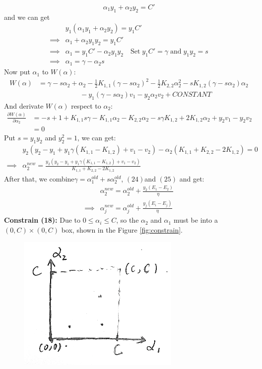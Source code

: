 \documentclass[a4paper]{article}
\begin{document}
\begin{enumerate}
{$$
	\alpha_1 y_1 + \alpha_2 y_2 = C'
$$
and we can get
\begin{align*}
	& y_1 (\alpha_1 y_1 + \alpha_2 y_2) = y_1 C' \\
	\implies & \alpha_1 + \alpha_2 y_1 y_2 = y_1 C' \\
	\implies & \alpha_1 = y_1 C' - \alpha_2 y_1 y_2 \quad \text{Set} \;  y_1 C' = \gamma \; \text{and} \;  y_1 y_2 = s \\
	\implies & \alpha_1 = \gamma - \alpha_2 s
\end{align*}
Now put $\alpha_1$ to $W(\alpha)$:
\begin{align*}
W(\alpha) &= \gamma - s \alpha_2 + \alpha_2 -\frac{1}{2}K_{1,1}(\gamma - s\alpha_2)^2 - \frac{1}{2}K_{2,2}\alpha_2^2 - sK_{1,2}(\gamma - s\alpha_2)\alpha_2 \\
	& \quad \quad \quad \quad\quad \quad  - y_1 (\gamma - s\alpha_2) v_1 - y_2 \alpha_2 v_2 + CONSTANT
\end{align*}
And derivate $W(\alpha)$ respect to $\alpha_2$:
\begin{align*}
	\frac{\partial W(\alpha)}{\partial \alpha_2} &= -s + 1 + K_{1,1} s \gamma - K_{1,1} \alpha_2 - K_{2,2} \alpha_2 - s \gamma K_{1,2} + 2K_{1,2}\alpha_2  + y_2 v_1 - y_2 v_2 \\
	&= 0
\end{align*}
Put $s=y_1 y_2$ and $y_2^2 = 1$, we can get:
\begin{align*}
& y_2 (y_2 - y_1 + y_1 \gamma (K_{1,1} - K_{1,2}) + v_1 - v_2) - \alpha_2 (K_{1,1} + K_{2,2} -2K_{1,2}) = 0 \\
\implies & \alpha_2^{new} = \frac{y_2 (y_2 - y_1 + y_1 \gamma (K_{1,1} - K_{1,2}) + v_1 - v_2)}{K_{1,1} + K_{2,2} - 2 K_{1,2}}
\end{align*}
After that, we combine$\gamma = \alpha_1^{old} + s \alpha_2^{old}$, $(24) $and $(25)$ and get:
\begin{align}
&\alpha_2^{new} = \alpha_2^{old} + \frac{y_2 (E_1 - E_2)}{\eta} \nonumber \\
\implies & \alpha_j^{new} = \alpha_j^{old} + \frac{y_j (E_i - E_j)}{\eta}
\end{align} 
\textbf{Constrain (18):} Due to $0 \leq \alpha_i \leq C$, so the $\alpha_2$ and $\alpha_1$ must be into a $(0, C) \times (0, C)$ box, shown in the Figure \ref{fig:constrain}.
\begin{figure}[h!]
  \centering
    \includegraphics[width=0.7\textwidth]{./images/constrain}

\end{figure}}
\end{enumerate}
\end{document}
